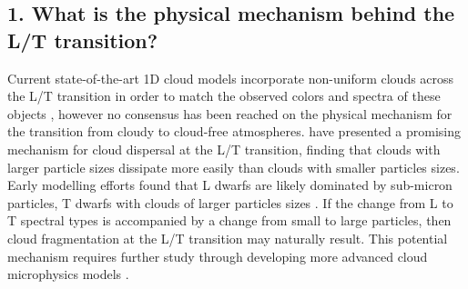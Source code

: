 \documentclass[12pt]{article}
\begin{document}
\begin{justify}
\subsection*{1. What is the physical mechanism behind the L/T transition?}



 Current state-of-the-art 1D cloud models incorporate non-uniform clouds across the L/T transition in order to match the observed colors and spectra of these objects \citep{Morley2014, Charnay2018}, however no consensus has been reached on the physical mechanism for the transition from cloudy to cloud-free atmospheres. 
 \citep{Tan2018} have presented a promising mechanism for cloud dispersal at the L/T transition, finding that clouds with larger particle sizes dissipate more easily than clouds with smaller particles sizes. Early modelling efforts found that L dwarfs are likely dominated by sub-micron particles, T dwarfs with clouds of larger particles sizes \citep[e.g.][]{Burningham2017, Saumon2008}. 
 If the change from L to T spectral types is accompanied by a change from small to large particles, then cloud fragmentation at the L/T transition may naturally result. This potential mechanism requires further study through developing more advanced cloud microphysics models \citep{Helling2008}. \smallskip


\end{justify}
\end{document}
